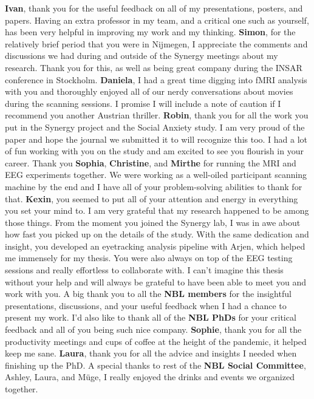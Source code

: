 \textbf{Ivan}, thank you for the useful feedback on all of my presentations, posters, and papers. Having an extra professor in my team, and a critical one such as yourself, has been very helpful in improving my work and my thinking. \newline
\textbf{Simon}, for the relatively brief period that you were in Nijmegen, I appreciate the comments and discussions we had during and outside of the Synergy meetings about my research. Thank you for this, as well as being great company during the INSAR conference in Stockholm. \newline
\textbf{Daniela}, I had a great time digging into fMRI analysis with you and thoroughly enjoyed all of our nerdy conversations about movies during the scanning sessions. I promise I will include a note of caution if I recommend you another Austrian thriller. \newline
\textbf{Robin}, thank you for all the work you put in the Synergy project and the Social Anxiety study. I am very proud of the paper and hope the journal we submitted it to will recognize this too. I had a lot of fun working with you on the study and am excited to see you flourish in your career. \newline
Thank you \textbf{Sophia}, \textbf{Christine}, and \textbf{Mirthe} for running the MRI and EEG experiments together. We were working as a well-oiled participant scanning machine by the end and I have all of your problem-solving abilities to thank for that. \newline
\textbf{Kexin}, you seemed to put all of your attention and energy in everything you set your mind to. I am very grateful that my research happened to be among those things. From the moment you joined the Synergy lab, I was in awe about how fast you picked up on the details of the study. With the same dedication and insight, you developed an eyetracking analysis pipeline with Arjen, which helped me immensely for my thesis. You were also always on top of the EEG testing sessions and really effortless to collaborate with. I can't imagine this thesis without your help and will always be grateful to have been able to meet you and work with you. \newline
A big thank you to all the \textbf{NBL members} for the insightful presentations, discussions, and your useful feedback when I had a chance to present my work. I'd also like to thank all of the \textbf{NBL PhDs} for your critical feedback and all of you being such nice company. \textbf{Sophie}, thank you for all the productivity meetings and cups of coffee at the height of the pandemic, it helped keep me sane. \textbf{Laura}, thank you for all the advice and insights I needed when finishing up the PhD. A special thanks to rest of the \textbf{NBL Social Committee}, Ashley, Laura, and M\"{u}ge, I really enjoyed the drinks and events we organized together. \newline
